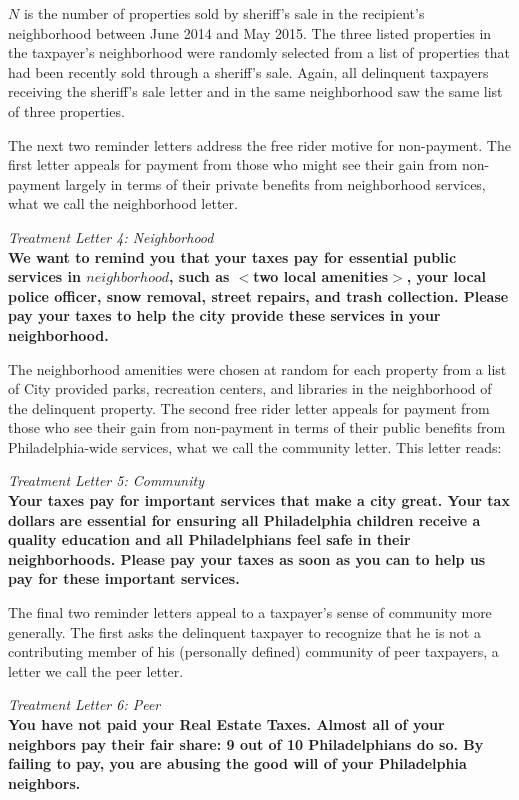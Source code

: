 \documentclass[12pt]{article}
\begin{document}
$N$ is the number of properties sold by sheriff's sale in the recipient's
neighborhood between June 2014 and May 2015.  The three listed
properties in the taxpayer's neighborhood were randomly selected from
a list of properties that had been recently sold through a sheriff's
sale.  Again, all delinquent taxpayers receiving the sheriff's sale
letter and in the same neighborhood saw the same list of three
properties.

The next two reminder letters address the free rider motive for
non-payment.  The first letter appeals for payment from those who
might see their gain from non-payment largely in terms of their
private benefits from neighborhood services, what we call the
neighborhood letter.  

{\it Treatment Letter 4: Neighborhood } \\ {\bf We want to remind you that
  your taxes pay for essential public services in $neighborhood$, such
  as $<$two local amenities$>$, your local police officer, snow
  removal, street repairs, and trash collection. Please pay your taxes
  to help the city provide these services in your neighborhood.}

The neighborhood amenities were chosen at random for each property
from a list of City provided parks, recreation centers, and libraries
in the neighborhood of the delinquent property.  The second free rider
letter appeals for payment from those who see their gain from
non-payment in terms of their public benefits from Philadelphia-wide
services, what we call the community letter.  This letter reads:

{\it Treatment Letter 5: Community} \\ {\bf Your taxes pay for important
  services that make a city great. Your tax dollars are essential for
  ensuring all Philadelphia children receive a quality education and
  all Philadelphians feel safe in their neighborhoods. Please pay your
  taxes as soon as you can to help us pay for these important
  services.}

The final two reminder letters appeal to a taxpayer's sense of
community more generally.  The first asks the delinquent taxpayer to
recognize that he is not a contributing member of his (personally
defined) community of peer taxpayers, a letter we call the peer
letter.  

{\it Treatment Letter 6: Peer} \\ {\bf You have not paid your Real
  Estate Taxes. Almost all of your neighbors pay their fair share: 9
  out of 10 Philadelphians do so. By failing to pay, you are abusing
  the good will of your Philadelphia neighbors.}
\end{document}
